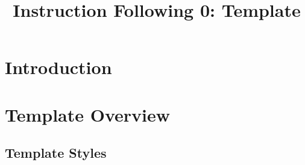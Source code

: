 \title{Instruction Following 0: Template}

\maketitle

\section{Introduction}

\section{Template Overview}

\subsection{Template Styles}